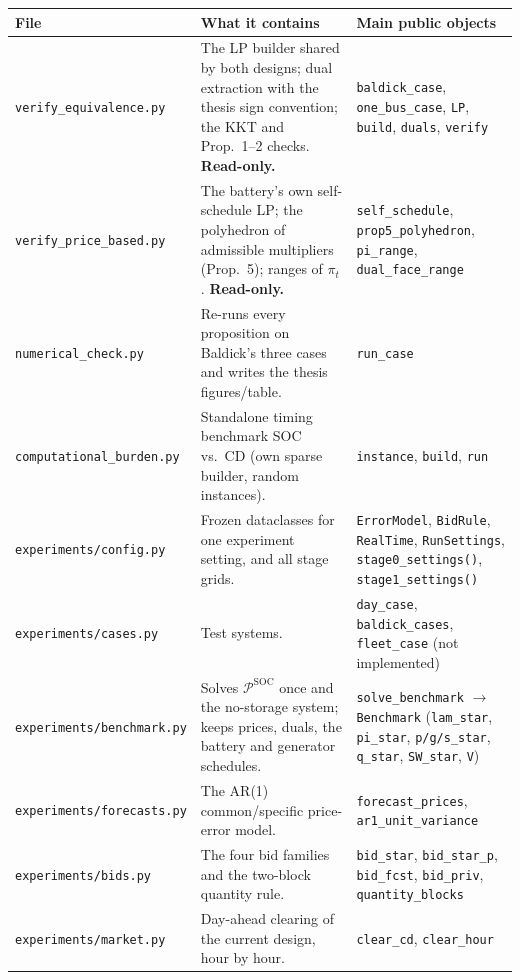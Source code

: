 \documentclass[10pt,a4paper]{article}
\newcommand{\code}[1]{\texttt{#1}}
\begin{document}
\begin{center}\small
\begin{tabularx}{\textwidth}{@{}l>{\raggedright\arraybackslash}X>{\raggedright\arraybackslash}p{4.3cm}@{}}
\toprule
File & What it contains & Main public objects \\
\midrule
\code{verify\_equivalence.py} & The LP builder shared by both designs; dual extraction with the thesis sign convention; the KKT and Prop.~1--2 checks. \textbf{Read-only.} & \code{baldick\_case}, \code{one\_bus\_case}, \code{LP}, \code{build}, \code{duals}, \code{verify} \\
\code{verify\_price\_based.py} & The battery's own self-schedule LP; the polyhedron of admissible multipliers (Prop.~5); ranges of $\pi_t$. \textbf{Read-only.} & \code{self\_schedule}, \code{prop5\_polyhedron}, \code{pi\_range}, \code{dual\_face\_range} \\
\code{numerical\_check.py} & Re-runs every proposition on Baldick's three cases and writes the thesis figures/table. & \code{run\_case} \\
\code{computational\_burden.py} & Standalone timing benchmark SOC vs.\ CD (own sparse builder, random instances). & \code{instance}, \code{build}, \code{run} \\
\midrule
\code{experiments/config.py} & Frozen dataclasses for one experiment setting, and all stage grids. & \code{ErrorModel}, \code{BidRule}, \code{RealTime}, \code{RunSettings}, \code{stage0\_settings()}, \code{stage1\_settings()} \\
\code{experiments/cases.py} & Test systems. & \code{day\_case}, \code{baldick\_cases}, \code{fleet\_case} (not implemented) \\
\code{experiments/benchmark.py} & Solves $\mathcal P^{\text{SOC}}$ once and the no-storage system; keeps prices, duals, the battery and generator schedules. & \code{solve\_benchmark} $\to$ \code{Benchmark} (\code{lam\_star}, \code{pi\_star}, \code{p/g/s\_star}, \code{q\_star}, \code{SW\_star}, \code{V}) \\
\code{experiments/forecasts.py} & The AR(1) common/specific price-error model. & \code{forecast\_prices}, \code{ar1\_unit\_variance} \\
\code{experiments/bids.py} & The four bid families and the two-block quantity rule. & \code{bid\_star}, \code{bid\_star\_p}, \code{bid\_fcst}, \code{bid\_priv}, \code{quantity\_blocks} \\
\code{experiments/market.py} & Day-ahead clearing of the current design, hour by hour. & \code{clear\_cd}, \code{clear\_hour} \\

\end{tabularx}
\end{center}
\end{document}
